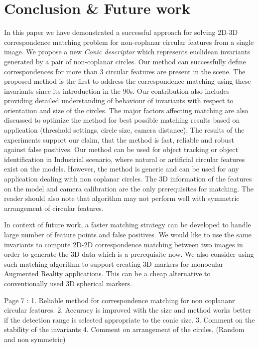 \documentclass{bmvc2k}
\begin{document}
\section{Conclusion \& Future work }
In this paper we have demonstrated a successful approach for solving 2D-3D correspondence matching problem for non-coplanar circular features from a single image. 
We propose a new \textit{Conic descriptor} which represents euclidean invariants generated by a pair of non-coplanar circles.
Our method can successfully define correspondences for more than 3 circular features are present in the scene. 
The proposed method is the first to address the correspondence matching using these invariants since its introduction in the 90s.
Our contribution also includes providing detailed understanding of behaviour of invariants with respect to orientation and size of the circles. The major factors affecting matching are also discussed to optimize the method for best possible matching results based on application (threshold settings, circle size, camera distance). 
The results of the experiments support our claim, that the method is fast, reliable and robust against false positives.
Our method can be used for object tracking or object identification in Industrial scenario, where natural or artificial circular features exist on the models. However, the method is generic and can be used for any application dealing with non coplanar circles. 
The 3D information of the features on the model and camera calibration are the only prerequisites for matching. 
The reader should also note that algorithm may not perform well with symmetric arrangement of circular features. 

In context of future work, a faster matching strategy can be developed to handle large number of feature points and false positives. We would like to use the same invariants to compute 2D-2D correspondence matching between two images in order to generate the 3D data which is a prerequisite now. We also consider using such matching algorithm to support creating 3D markers for monocular Augmented Reality applications. This can be a cheap alternative to conventionally used 3D spherical markers.  

Page 7 : 
1. Reliable method for correspondence matching for non coplananr circular features. 
2. Accuracy is improved with the size and method works better if the detection range is selected appropriate to the conic size. 
3. Comment on the stability of the invariants 
4. Comment on arrangement of the circles. (Random and non symmetric)


\end{document}
